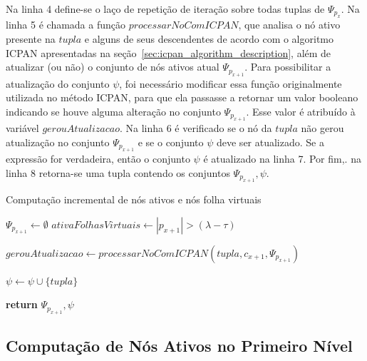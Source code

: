 Na linha 4 define-se o laço de repetição de iteração sobre todas tuplas de $\Psi_{p_x}$. Na linha 5 é chamada a função $processarNoComICPAN$, que analisa o nó ativo presente na $tupla$ e alguns de seus descendentes de acordo com o algoritmo ICPAN apresentadas na seção~\ref{sec:icpan_algorithm_description}, além de atualizar (ou não) o conjunto de nós ativos atual $\Psi_{p_{x+1}}$. Para possibilitar a atualização do conjunto $\psi$, foi necessário modificar essa função originalmente utilizada no método ICPAN, para que ela passasse a retornar um valor booleano indicando se houve alguma alteração no conjunto $\Psi_{p_{x+1}}$. Esse valor é atribuído à variável $gerouAtualizacao$. Na linha 6 é verificado se o nó da $tupla$ não gerou atualização no conjunto $\Psi_{p_{x+1}}$ e se o conjunto $\psi$ deve ser atualizado. Se a expressão for verdadeira, então o conjunto $\psi$ é atualizado na linha 7. Por fim,. na linha 8 retorna-se uma tupla contendo os conjuntos $\Psi_{p_{x+1}}, \psi$.

\begin{algorithm}[t]
\caption{Computação incremental de nós ativos e nós folha virtuais }\label{alg:compute_active_and_virtual_leaf_nodes}
\begin{algorithmic}[1]
    \State $\Psi_{p_{x+1}} \leftarrow \emptyset$
    \State $ativaFolhasVirtuais \leftarrow |p_{x+1}| > (\lambda - \tau)$
    
        \State $gerouAtualizacao \leftarrow processarNoComICPAN(tupla, c_{x+1}, \Psi_{p_{x+1}})$
        
            \State $\psi \leftarrow \psi \cup \{tupla\}$
        \EndIf
    \EndFor
    
    \State \textbf{return} $\Psi_{p_{x+1}}, \psi$
\EndFunction
\end{algorithmic}
\end{algorithm}

\subsection{Computação de Nós Ativos no Primeiro Nível}
\label{sec:first_level_active_node_set_computation}


